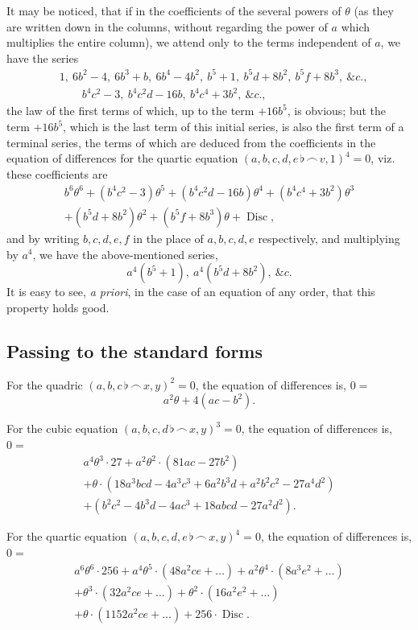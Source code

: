 \documentclass[11pt,a4paper]{book}
\providecommand{\Disc}{\mathop{\mathrm{Disc}}\nolimits}
\begin{document}
It may be noticed, that if in the coefficients of the several powers of $\theta$ (as they are written down in the columns, without regarding the power of $a$ which multiplies the entire column), we attend only to the terms independent of $a$, we have the series
\begin{align*}
&1,\ 6b^2-4,\ 6b^3+b,\ 6b^4-4b^2,\ b^5+1,\ b^5d+8b^2,\ b^5f+8b^3,\ \&c.,\\
&\qquad b^4c^2-3,\ b^4c^2d-16b,\ b^4c^4+3b^2,\ \&c.,
\end{align*}
the law of the first terms of which, up to the term $+16b^5$, is obvious; but the term $+16b^5$, which is the last term of this initial series, is also the first term of a terminal series, the terms of which are deduced from the coefficients in the equation of differences for the quartic equation $(a,b,c,d,e\,\flat\,\frown\, v,1)^4=0$, viz. these coefficients are
\begin{multline*}
b^6\theta^6+(b^4c^2-3)\theta^5+(b^4c^2d-16b)\theta^4+(b^4c^4+3b^2)\theta^3\\
+(b^5d+8b^2)\theta^2+(b^5f+8b^3)\theta+\Disc,
\end{multline*}
and by writing $b,c,d,e,f$ in the place of $a,b,c,d,e$ respectively, and multiplying by $a^4$, we have the above-mentioned series,
\[
a^4(b^5+1),\ a^4(b^5d+8b^2),\ \&c.
\]
It is easy to see, \textit{a priori}, in the case of an equation of any order, that this property holds good.

\subsection*{Passing to the standard forms}

For the quadric $(a,b,c\,\flat\,\frown\, x,y)^2=0$, the equation of differences is, $0=$
\[
a^2\theta+4(ac-b^2).
\]

For the cubic equation $(a,b,c,d\,\flat\,\frown\, x,y)^3=0$, the equation of differences is, $0=$
\begin{multline*}
a^4\theta^3\cdot27+a^2\theta^2\cdot(81ac-27b^2)\\
+\theta\cdot(18a^3bcd-4a^3c^3+6a^2b^3d+a^2b^2c^2-27a^4d^2)\\
+(b^2c^2-4b^3d-4ac^3+18abcd-27a^2d^2).
\end{multline*}

For the quartic equation $(a,b,c,d,e\,\flat\,\frown\, x,y)^4=0$, the equation of differences is, $0=$
\begin{multline*}
a^6\theta^6\cdot256+a^4\theta^5\cdot(48a^2ce+\ldots)+a^2\theta^4\cdot(8a^3e^2+\ldots)\\
+\theta^3\cdot(32a^2ce+\ldots)+\theta^2\cdot(16a^2e^2+\ldots)\\
+\theta\cdot(1152a^2ce+\ldots)+256\cdot\Disc.
\end{multline*}
\end{document}

